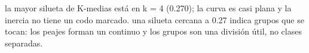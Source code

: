 {la mayor silueta de K-medias está en k = 4 (0.270); la curva es casi plana y la inercia no tiene un codo marcado.}
{una silueta cercana a 0.27 indica grupos que se tocan: los peajes forman un continuo y los grupos son una división útil, no clases separadas.}
